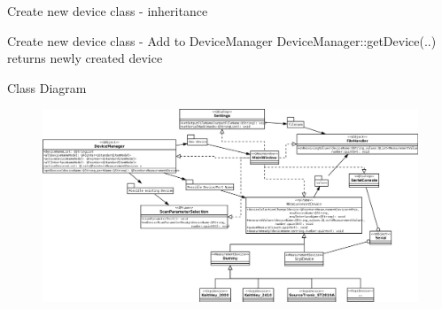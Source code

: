\documentclass{beamer}
\institute[II. Physikalisches Institut] %
{
  II. Physikalisches Institut, Justus-Liebig-Universität Giessen
}
\date
\begin{document}
\begin{frame}
	\titlepage
\end{frame}

\begin{frame}{Create new device class - inheritance}
\end{frame}

\begin{frame}{Create new device class - Add to DeviceManager}
	DeviceManager::getDevice(..) returns newly created device
	\begin{tiny}
		
	\end{tiny}
\end{frame}

\begin{frame}{Class Diagram}
	\begin{figure}[H]
		\includegraphics[width=\textwidth]{generalpurposecontrol.png}
	\end{figure}
\end{frame}
\end{document}
